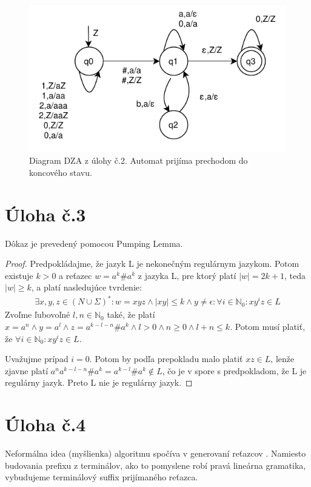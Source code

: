 \documentclass[10pt]{article}
\begin{document}
\begin{figure}
    \label{automata}
    \centering
    \includegraphics{dpda.pdf}
    \caption{Diagram DZA z úlohy č.2. Automat prijíma prechodom do koncového stavu.}
\end{figure}


\section*{Úloha č.3}
Dôkaz je prevedený pomocou Pumping Lemma. 
\begin{proof}
Predpokládajme, že jazyk L je nekonečným regulárnym jazykom. Potom existuje $k > 0$ a reťazec $w =
a^k\#a^k$ z jazyka L, pre ktorý platí $|w| = 2k+1$, teda $|w|\geq k$, a platí nasledujúce tvrdenie:
\begin{align*}
    \exists x,y,z \in (N \cup \Sigma)^*: w = xyz \land |xy| \leq k \land y \neq \epsilon : \forall i \in
    \mathbb{N}_0: xy^iz \in L 
\end{align*}
    Zvoľme ľubovoľné $l,n \in \mathbb{N}_0$ také, že platí $x = a^{n} \land y = a^{l} \land z =
    a^{k-l-n}\#a^k \land l > 0 \land n \geq 0 \land l+n \leq k$. Potom musí platiť, že $\forall
i \in \mathbb{N}_0: xy^iz \in L$.

Uvažujme prípad $i = 0$. Potom by podľa prepokladu malo platiť $xz \in L$, lenže zjavne platí
    $a^{n}a^{k-l-n}\#a^{k} = a^{k-l}\#a^{k} \notin L$, čo je v spore s predpokladom, že L je regulárny jazyk. Preto L nie je regulárny jazyk.
\end{proof}


\section*{Úloha č.4}
Neformálna idea (myšlienka) algoritmu spočíva v generovaní reťazcov . Namiesto budovania prefixu z terminálov,
ako to pomyslene robí pravá lineárna gramatika, vybudujeme terminálový suffix prijímaného reťazca.
\end{document}
